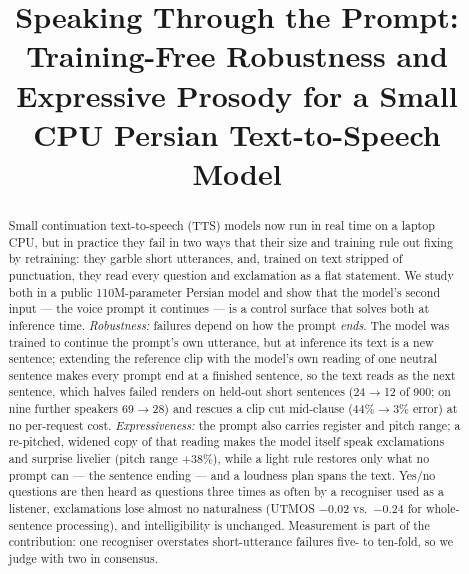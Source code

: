 \documentclass[conference]{IEEEtran}
\newcommand{\RES}[1]{#1}
\begin{document}
\title{Speaking Through the Prompt: Training-Free Robustness and Expressive Prosody for a Small CPU
Persian Text-to-Speech Model}

\author{
}

\maketitle

\begin{abstract}
Small continuation text-to-speech (TTS) models now run in real time on a laptop CPU, but in practice they
fail in two ways that their size and training rule out fixing by retraining: they garble short utterances,
and, trained on text stripped of punctuation, they read every question and exclamation as a flat statement.
We study both in a public 110M-parameter Persian model and show that the model's second input --- the voice
prompt it continues --- is a control surface that solves both at inference time. \emph{Robustness:} failures
depend on how the prompt \emph{ends}. The model was trained to continue the prompt's own utterance, but at
inference its text is a new sentence; extending the reference clip with the model's own reading of one
neutral sentence makes every prompt end at a finished sentence, so the text reads as the next sentence,
which halves failed renders on held-out short sentences (\RES{24$\to$12} of \RES{900}; on nine further speakers
\RES{69$\to$28}) and rescues a clip cut mid-clause (\RES{44\%$\to$3\%} error) at no per-request cost. \emph{Expressiveness:} the prompt also carries register
and pitch range; a re-pitched, widened copy of that reading makes the model itself speak exclamations and
surprise livelier (pitch range \RES{+38\%}), while a light rule restores only what no prompt can --- the
sentence ending --- and a loudness plan spans the text. Yes/no questions are then heard as questions three
times as often by a recogniser used as a listener, exclamations lose almost no naturalness
(UTMOS \RES{$-$0.02} vs.\ \RES{$-$0.24} for whole-sentence processing), and intelligibility is unchanged.
Measurement is part of the contribution: one recogniser overstates short-utterance failures five- to
ten-fold, so we judge with two in consensus.
\end{abstract}
\end{document}
